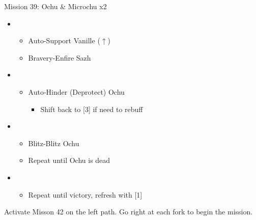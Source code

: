 \begin{battle}{Mission 39: Ochu \& Microchu x2}
	\begin{itemize}
		\item \third
			\begin{itemize}
				\item Auto-Support Vanille ($\uparrow$)
				\item Bravery-Enfire Sazh
			\end{itemize}
		\item \second
			\begin{itemize}
				\item Auto-Hinder (Deprotect) Ochu
					\begin{itemize}
						\item Shift back to [3] if need to rebuff
					\end{itemize}
			\end{itemize}
		\item \first
			\begin{itemize}
				\item Blitz-Blitz Ochu
				\item Repeat until Ochu is dead
			\end{itemize}
		\item \fourth
			\begin{itemize}
				\item Repeat until victory, refresh with [1]
			\end{itemize}												
	\end{itemize}
\end{battle}

Activate Misson 42 on the left path.
Go right at each fork to begin the mission.

